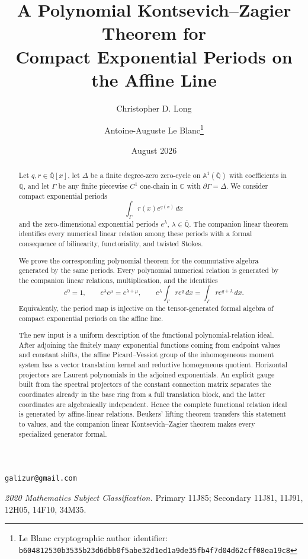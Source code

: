 \documentclass[11pt]{article}
\title{A Polynomial Kontsevich--Zagier Theorem for\\
Compact Exponential Periods on the Affine Line}
\author{Christopher D. Long \and Antoine-Auguste Le Blanc\thanks{Le Blanc cryptographic author identifier: \texttt{b6048125\allowbreak{}30b3535b\allowbreak{}23d6dbb0\allowbreak{}f5abe32d\allowbreak{}1ed1a9de\allowbreak{}35fb4f7d\allowbreak{}04d62cff\allowbreak{}08ea19c8}}}
\date{August 2026}
\numberwithin{equation}{section}
\theoremstyle{definition}
\theoremstyle{remark}
\newcommand{\C}{\mathbb C}
\newcommand{\Qbar}{\overline{\mathbb Q}}
\newcommand{\Aone}{\mathbb A^1}
\begin{document}
\maketitle

\begin{center}
\small
\texttt{galizur@gmail.com}
\end{center}

\begin{abstract}
Let $q,r\in\Qbar[x]$, let $\Delta$ be a finite degree-zero zero-cycle on
$\Aone(\Qbar)$ with coefficients in $\Qbar$, and let $\Gamma$ be any finite
piecewise $C^1$ one-chain in $\C$ with $\partial\Gamma=\Delta$.  We consider
compact exponential periods
\[
  \int_\Gamma r(x)e^{q(x)}\,dx
\]
and the zero-dimensional exponential periods $e^\lambda$, $\lambda\in\Qbar$.
The companion linear theorem identifies every numerical linear relation among
these periods with a formal consequence of bilinearity, functoriality, and
twisted Stokes.

We prove the corresponding polynomial theorem for the commutative algebra
generated by the same periods.  Every polynomial numerical relation is
generated by the companion linear relations, multiplication, and the
identities
\[
  e^0=1,\qquad e^\lambda e^\mu=e^{\lambda+\mu},\qquad
  e^\lambda\int_\Gamma r e^q\,dx
  =\int_\Gamma r e^{q+\lambda}\,dx.
\]
Equivalently, the period map is injective on the tensor-generated formal
algebra of compact exponential periods on the affine line.

The new input is a uniform description of the functional polynomial-relation
ideal.  After adjoining the finitely many exponential functions coming from
endpoint values and constant shifts, the affine Picard--Vessiot group of the
inhomogeneous moment system has a vector translation kernel and reductive
homogeneous quotient.  Horizontal projectors are Laurent polynomials in the
adjoined exponentials.  An explicit gauge built from the spectral projectors
of the constant connection matrix separates the coordinates
already in the base ring from a full translation block, and the latter
coordinates are algebraically independent.  Hence the complete functional
relation ideal is generated by affine-linear relations.  Beukers' lifting
theorem transfers this statement to values, and the companion linear
Kontsevich--Zagier theorem makes every specialized generator formal.
\end{abstract}

\medskip
\noindent\textit{2020 Mathematics Subject Classification.}
Primary 11J85; Secondary 11J81, 11J91, 12H05, 14F10, 34M35.
\end{document}
